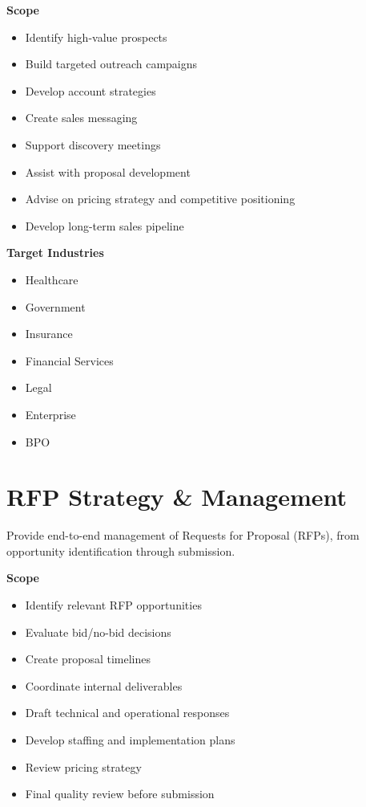 \documentclass{toospoint}
\begin{document}
\vspace{4pt}
\noindent\textbf{\color{TPDark}Scope}
\begin{itemize}[leftmargin=1.5em, itemsep=2pt, topsep=2pt]
  \item Identify high-value prospects
  \item Build targeted outreach campaigns
  \item Develop account strategies
  \item Create sales messaging
  \item Support discovery meetings
  \item Assist with proposal development
  \item Advise on pricing strategy and competitive positioning
  \item Develop long-term sales pipeline
\end{itemize}

\vspace{4pt}
\noindent\textbf{\color{TPDark}Target Industries}
\begin{itemize}[leftmargin=1.5em, itemsep=2pt, topsep=2pt]
  \item Healthcare
  \item Government
  \item Insurance
  \item Financial Services
  \item Legal
  \item Enterprise
  \item BPO
\end{itemize}

\section{RFP Strategy \& Management}

Provide end-to-end management of Requests for Proposal (RFPs), from
opportunity identification through submission.

\vspace{4pt}
\noindent\textbf{\color{TPDark}Scope}
\begin{itemize}[leftmargin=1.5em, itemsep=2pt, topsep=2pt]
  \item Identify relevant RFP opportunities
  \item Evaluate bid/no-bid decisions
  \item Create proposal timelines
  \item Coordinate internal deliverables
  \item Draft technical and operational responses
  \item Develop staffing and implementation plans
  \item Review pricing strategy
  \item Final quality review before submission
\end{itemize}
\end{document}
